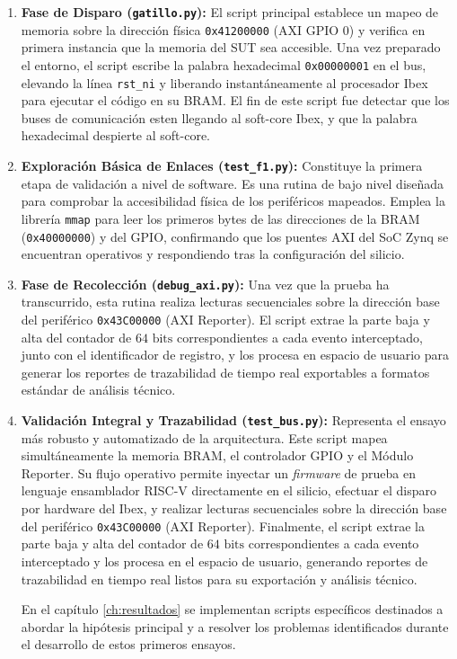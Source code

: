 \begin{enumerate}
    \item \textbf{Fase de Disparo (\texttt{gatillo.py}):} El script principal establece un mapeo de memoria sobre la dirección física \texttt{0x41200000} (AXI GPIO 0) y verifica en primera instancia que la memoria del SUT sea accesible. Una vez preparado el entorno, el script escribe la palabra hexadecimal \texttt{0x00000001} en el bus, elevando la línea \texttt{rst\_ni} y liberando instantáneamente al procesador Ibex para ejecutar el código en su BRAM.
    El fin de este script fue detectar que los buses de comunicación esten llegando al soft-core Ibex, y que la palabra hexadecimal despierte al soft-core.

    \item \textbf{Exploración Básica de Enlaces (\texttt{test\_f1.py}):} 
    Constituye la primera etapa de validación a nivel de software. Es una rutina de bajo nivel diseñada para comprobar la accesibilidad física de los periféricos mapeados. Emplea la librería \texttt{mmap} para leer los primeros bytes de las direcciones de la BRAM (\texttt{0x40000000}) y del GPIO, confirmando que los puentes AXI del SoC Zynq se encuentran operativos y respondiendo tras la configuración del silicio.
    
    \item \textbf{Fase de Recolección (\texttt{debug\_axi.py}):} Una vez que la prueba ha transcurrido, esta rutina realiza lecturas secuenciales sobre la dirección base del periférico \texttt{0x43C00000} (AXI Reporter). El script extrae la parte baja y alta del contador de $64\text{ bits}$ correspondientes a cada evento interceptado, junto con el identificador de registro, y los procesa en espacio de usuario para generar los reportes de trazabilidad de tiempo real exportables a formatos estándar de análisis técnico.

    \item \textbf{Validación Integral y Trazabilidad (\texttt{test\_bus.py}):} 
    Representa el ensayo más robusto y automatizado de la arquitectura. Este script mapea simultáneamente la memoria BRAM, el controlador GPIO y el Módulo Reporter. Su flujo operativo permite inyectar un \textit{firmware} de prueba en lenguaje ensamblador RISC-V directamente en el silicio, efectuar el disparo por hardware del Ibex, y realizar lecturas secuenciales sobre la dirección base del periférico \texttt{0x43C00000} (AXI Reporter). Finalmente, el script extrae la parte baja y alta del contador de $64\text{ bits}$ correspondientes a cada evento interceptado y los procesa en el espacio de usuario, generando reportes de trazabilidad en tiempo real listos para su exportación y análisis técnico.

En el capítulo \ref{ch:resultados} se implementan scripts específicos destinados a abordar la hipótesis principal y a resolver los problemas identificados durante el desarrollo de estos primeros ensayos.
\end{enumerate}

